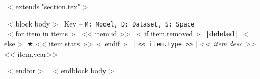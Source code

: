 ~< extends "section.tex" >~

~< block body >~
  \small{Key -- \texttt{M: Model, D: Dataset, S: Space}}\\
  ~< for item in items >~
    \href{<< item.repo_url >>}{<< item.id >>}
    ~< if item.removed >~\textbf{ [deleted] }~< else >~$\bigstar$ << item.stars >>~< endif >~
    | \small{\texttt{<< item.type >>}} |
    \emph{<< item.desc >>} \hfill
    << item.year>> \par
  ~< endfor >~
~< endblock body >~
